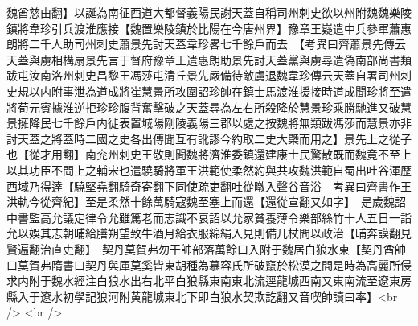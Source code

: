 魏酋慈由翻】以誕為南征西道大都督義陽民謝天蓋自稱司州刺史欲以州附魏魏樂陵鎮將韋珍引兵渡淮應接【魏置樂陵鎮於比陽在今唐州界】豫章王嶷遣中兵參軍蕭惠朗將二千人助司州刺史蕭景先討天蓋韋珍畧七千餘戶而去　【考異曰齊蕭景先傳云天蓋與虜相構扇景先言于督府豫章王遣惠朗助景先討天蓋黨與虜尋遣偽南部尚書類跋屯汝南洛州刺史昌黎王馮莎屯清丘景先嚴備待敵虜退魏韋珍傳云天蓋自署司州刺史規以内附事泄為道成將崔慧景所攻圍詔珍帥在鎮士馬渡淮援接時道成聞珍將至遣將荀元賓據淮逆拒珍珍腹背奮擊破之天蓋尋為左右所殺降於慧景珍乘勝馳進又破慧景擁降民七千餘戶内徙表置城陽剛陵義陽三郡以處之按魏將無類跋馮莎而慧景亦非討天蓋之將蓋時二國之史各出傳聞互有訛謬今約取二史大槩而用之】景先上之從子也【從才用翻】南兖州刺史王敬則聞魏將濟淮委鎮還建康士民驚散既而魏竟不至上以其功臣不問上之輔宋也遣驍騎將軍王洪範使柔然約與共攻魏洪範自蜀出吐谷渾歷西域乃得逹【驍堅堯翻騎奇寄翻下同使疏吏翻吐從暾入聲谷音浴　考異曰齊書作王洪軌今從齊紀】至是柔然十餘萬騎寇魏至塞上而還【還從宣翻又如字】　是歲魏詔中書監高允議定律令允雖篤老而志識不衰詔以允家貧養薄令樂部絲竹十人五日一詣允以娛其志朝晡給膳朔望致牛酒月給衣服綿絹入見則備几杖問以政治【晡奔謨翻見賢遍翻治直吏翻】　契丹莫賀弗勿干帥部落萬餘口入附于魏居白狼水東【契丹酋帥曰莫賀弗隋書曰契丹與庫莫奚皆東胡種為慕容氏所破竄於松漠之間是時為高麗所侵求内附于魏水經注白狼水出右北平白狼縣東南東北流逕龍城西南又東南流至遼東房縣入于遼水初學記狼河附黄龍城東北下即白狼水契欺訖翻又音喫帥讀曰率】<br />
<br />
